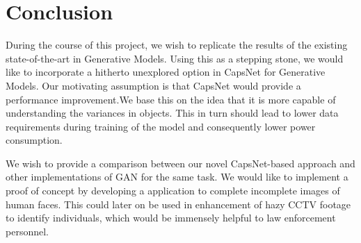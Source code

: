 \chapter{Conclusion}\label{ch:conclusion}

During the course of this project, we wish to replicate the results of the existing state-of-the-art in Generative Models. Using this as a stepping stone, we would like to incorporate a hitherto unexplored option in CapsNet for Generative Models. Our motivating assumption is that CapsNet would provide a performance improvement.We base this on the idea that it is more capable of understanding the variances in objects. This in turn should lead to lower data requirements during training of the model and consequently lower power consumption. 

\par\bigskip We wish to provide a comparison between our novel CapsNet-based approach and other implementations of GAN for the same task. We would like to implement a proof of concept by developing a application to complete incomplete images of human faces. This could later on be used in enhancement of hazy CCTV footage to identify individuals, which would be immensely helpful to law enforcement personnel.